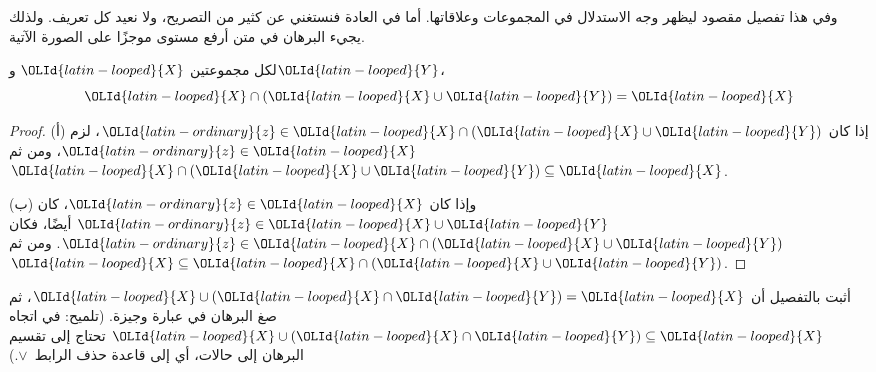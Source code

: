 \documentclass[../../../include/open-logic-section]{subfiles}
\begin{document}
\begin{explain}
وفي هذا تفصيل مقصود ليظهر وجه الاستدلال في المجموعات وعلاقاتها. أما في
العادة فنستغني عن كثير من التصريح، ولا نعيد كل تعريف. ولذلك يجيء البرهان
في متن أرفع مستوى موجزًا على الصورة الآتية.
\end{explain}


\begin{prop}[الامتصاص]
لكل مجموعتين ${\OLId{latin-looped}{X}}$ و${\OLId{latin-looped}{Y}}$،
\[
{\OLId{latin-looped}{X}} \cap ({\OLId{latin-looped}{X}} \cup {\OLId{latin-looped}{Y}}) = {\OLId{latin-looped}{X}}
\]
\end{prop}

\begin{proof}
(أ) إذا كان ${\OLId{latin-ordinary}{z}} \in {\OLId{latin-looped}{X}} \cap ({\OLId{latin-looped}{X}} \cup {\OLId{latin-looped}{Y}})$، لزم ${\OLId{latin-ordinary}{z}} \in {\OLId{latin-looped}{X}}$، ومن ثم
  ${\OLId{latin-looped}{X}} \cap ({\OLId{latin-looped}{X}} \cup {\OLId{latin-looped}{Y}}) \subseteq {\OLId{latin-looped}{X}}$.

(ب) وإذا كان ${\OLId{latin-ordinary}{z}} \in {\OLId{latin-looped}{X}}$، كان ${\OLId{latin-ordinary}{z}} \in {\OLId{latin-looped}{X}} \cup {\OLId{latin-looped}{Y}}$ أيضًا، فكان
  ${\OLId{latin-ordinary}{z}} \in {\OLId{latin-looped}{X}} \cap ({\OLId{latin-looped}{X}} \cup {\OLId{latin-looped}{Y}})$. ومن ثم
  ${\OLId{latin-looped}{X}} \subseteq {\OLId{latin-looped}{X}} \cap ({\OLId{latin-looped}{X}} \cup {\OLId{latin-looped}{Y}})$.
\end{proof}

\begin{prob}
أثبت بالتفصيل أن ${\OLId{latin-looped}{X}} \cup ({\OLId{latin-looped}{X}} \cap {\OLId{latin-looped}{Y}}) = {\OLId{latin-looped}{X}}$، ثم صغ البرهان في عبارة
وجيزة. (تلميح: في اتجاه ${\OLId{latin-looped}{X}} \cup ({\OLId{latin-looped}{X}} \cap {\OLId{latin-looped}{Y}}) \subseteq {\OLId{latin-looped}{X}}$ تحتاج
إلى تقسيم البرهان إلى حالات، أي إلى قاعدة حذف الرابط~$\lor$.)
\end{prob}
\end{document}
